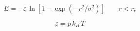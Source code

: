 \documentclass[12pt]{article}
\begin{document}
$$
	E = -\varepsilon\, \ln{\left[1-\exp{\left(-r^{2}/\sigma^{2}\right)}\right]} \qquad  r < r_c
$$

$$
  \varepsilon = p\,k_B\,T
$$
\end{document}
